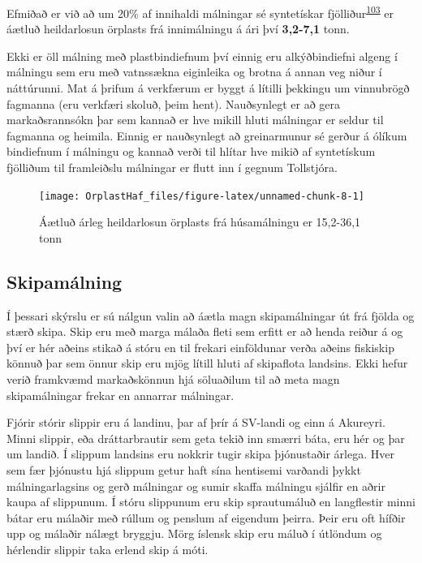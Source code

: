 \documentclass[icelandic,]{book}
\begin{document}
Efmiðað er við að um 20\% af innihaldi málningar sé syntetískar fjölliður\textsuperscript{\protect\hyperlink{ref-Hann2018}{103}} er áætluð heildarlosun örplasts frá innimálningu á ári því \textbf{3,2-7,1} tonn.

Ekki er öll málning með plastbindiefnum því einnig eru alkýðbindiefni algeng í málningu sem eru með vatnssækna eiginleika og brotna á annan veg niður í náttúrunni. Mat á þrifum á verkfærum er byggt á lítilli þekkingu um vinnubrögð fagmanna (eru verkfæri skoluð, þeim hent). Nauðsynlegt er að gera markaðsrannsókn þar sem kannað er hve mikill hluti málningar er seldur til fagmanna og heimila. Einnig er nauðsynlegt að greinarmunur sé gerður á ólíkum bindiefnum í málningu og kannað verði til hlítar hve mikið af syntetískum fjölliðum til framleiðslu málningar er flutt inn í gegnum Tollstjóra.

\begin{figure}

{\centering \texttt{[image: OrplastHaf\_files/figure-latex/unnamed-chunk-8-1]} 

}

\caption{Áætluð árleg heildarlosun örplasts frá húsamálningu er 15,2-36,1 tonn}\label{fig:unnamed-chunk-8}
\end{figure}

\hypertarget{skipamalning}{%
\subsection*{Skipamálning}\label{skipamalning}}

Í þessari skýrslu er sú nálgun valin að áætla magn skipamálningar út frá fjölda og stærð skipa. Skip eru með marga málaða fleti sem erfitt er að henda reiður á og því er hér aðeins stikað á stóru en til frekari einföldunar verða aðeins fiskiskip könnuð þar sem önnur skip eru mjög lítill hluti af skipaflota landsins. Ekki hefur verið framkvæmd markaðskönnun hjá söluaðilum til að meta magn skipamálningar frekar en annarrar málningar.

Fjórir stórir slippir eru á landinu, þar af þrír á SV-landi og einn á Akureyri. Minni slippir, eða dráttarbrautir sem geta tekið inn smærri báta, eru hér og þar um landið. Í slippum landsins eru nokkrir tugir skipa þjónustaðir árlega. Hver sem fær þjónustu hjá slippum getur haft sína hentisemi varðandi þykkt málningarlagsins og gerð málningar og sumir skaffa málningu sjálfir en aðrir kaupa af slippunum. Í stóru slippunum eru skip sprautumáluð en langflestir minni bátar eru málaðir með rúllum og penslum af eigendum þeirra. Þeir eru oft hífðir upp og málaðir nálægt bryggju. Mörg íslensk skip eru máluð í útlöndum og hérlendir slippir taka erlend skip á móti.
\end{document}
